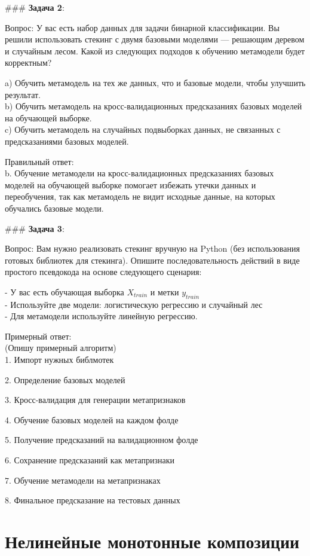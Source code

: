 ### \textbf{Задача 2}: 

Вопрос: У вас есть набор данных для задачи бинарной классификации. Вы решили использовать стекинг с двумя базовыми моделями — решающим деревом и случайным лесом. Какой из следующих подходов к обучению метамодели будет корректным?

a) Обучить метамодель на тех же данных, что и базовые модели, чтобы улучшить результат.  \\
b) Обучить метамодель на кросс-валидационных предсказаниях базовых моделей на обучающей выборке.  \\
c) Обучить метамодель на случайных подвыборках данных, не связанных с предсказаниями базовых моделей.

Правильный ответ:  \\
b. Обучение метамодели на кросс-валидационных предсказаниях базовых моделей на обучающей выборке помогает избежать утечки данных и переобучения, так как метамодель не видит исходные данные, на которых обучались базовые модели.


### \textbf{Задача 3}:

Вопрос: Вам нужно реализовать стекинг вручную на Python (без использования готовых библиотек для стекинга). Опишите последовательность действий в виде простого псевдокода на основе следующего сценария:

- У вас есть обучающая выборка $X_{train}$ и метки $y_{train}$ \\
- Используйте две модели: логистическую регрессию и случайный лес \\
- Для метамодели используйте линейную регрессию.

Примерный ответ:\\
(Опишу примерный алгоритм)\\
1. Импорт нужных библмотек

2. Определение базовых моделей

3. Кросс-валидация для генерации метапризнаков

4. Обучение базовых моделей на каждом фолде
    
5. Получение предсказаний на валидационном фолде
    
6. Сохранение предсказаний как метапризнаки

7. Обучение метамодели на метапризнаках

8. Финальное предсказание на тестовых данных


\section{Нелинейные монотонные композиции}
